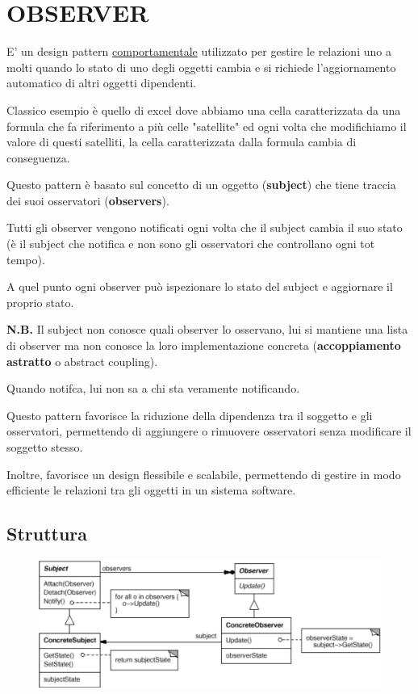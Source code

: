 
\chapter{OBSERVER}

E' un design pattern \underline{comportamentale} utilizzato per gestire le relazioni uno a molti quando lo stato di uno degli oggetti cambia e si richiede 
l'aggiornamento automatico di altri oggetti dipendenti.
\medskip

Classico esempio è quello di excel dove abbiamo una cella caratterizzata da una formula che fa riferimento a più celle "satellite" ed ogni volta che modifichiamo il
valore di questi satelliti, la cella caratterizzata dalla formula cambia di conseguenza.
\medskip

Questo pattern è basato sul concetto di un oggetto (\textbf{subject}) che tiene traccia dei suoi osservatori (\textbf{observers}).

Tutti gli observer vengono notificati ogni volta che il subject cambia il suo stato (è il subject che notifica e non sono gli osservatori che controllano ogni 
tot tempo).

A quel punto ogni observer può ispezionare lo stato del subject e aggiornare il proprio stato.

\medskip
\textbf{N.B.} Il subject non conosce quali observer lo osservano, lui si mantiene una lista di observer ma non conosce la loro implementazione concreta 
(\textbf{accoppiamento astratto} o abstract coupling).

Quando notifca, lui non sa a chi sta veramente notificando.
\medskip

Questo pattern favorisce la riduzione della dipendenza tra il soggetto e gli osservatori, permettendo di aggiungere o rimuovere osservatori senza modificare il 
soggetto stesso. 

Inoltre, favorisce un design flessibile e scalabile, permettendo di gestire in modo efficiente le relazioni tra gli oggetti in un sistema software.

\section{Struttura}

\begin{figure}[h]
    \centering
    \includegraphics[width=0.5\linewidth]{../../immagini/observer_publishSubscribe/struttura_observer}
\end{figure}

